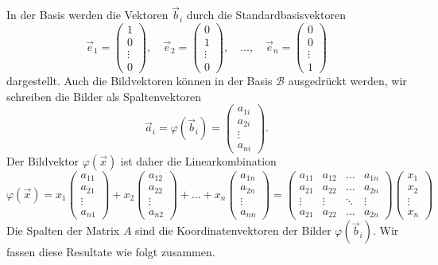 In der Basis werden die Vektoren $\vec{b}_i$ durch die Standardbasisvektoren
\[
\vec{e}_1 = \begin{pmatrix}1\\0\\\vdots\\0\end{pmatrix},\quad
\vec{e}_2 = \begin{pmatrix}0\\1\\\vdots\\0\end{pmatrix},
\quad\dots,\quad
\vec{e}_n = \begin{pmatrix}0\\0\\\vdots\\1\end{pmatrix}
\]
dargestellt.
Auch die Bildvektoren können in der Basis $\mathcal{B}$ ausgedrückt werden,
wir schreiben die Bilder als Spaltenvektoren
\[
\vec{a}_i
=
\varphi(\vec{b}_i)
=
\begin{pmatrix}
a_{1i}\\a_{2i}\\\vdots\\a_{ni}
\end{pmatrix}.
\]
Der Bildvektor $\varphi(\vec{x})$ ist daher die Linearkombination
\[
\varphi(\vec{x})
=
x_1
\begin{pmatrix}
a_{11}\\a_{21}\\\vdots\\a_{n1}
\end{pmatrix}
+
x_2
\begin{pmatrix}
a_{12}\\a_{22}\\\vdots\\a_{n2}
\end{pmatrix}
+
\dots
+
x_n
\begin{pmatrix}
a_{1n}\\a_{2n}\\\vdots\\a_{nn}
\end{pmatrix}
=
\begin{pmatrix}
a_{11}&a_{12}&\dots &a_{1n}\\
a_{21}&a_{22}&\dots &a_{2n}\\
\vdots&\vdots&\ddots&\vdots\\
a_{21}&a_{22}&\dots &a_{2n}
\end{pmatrix}
\begin{pmatrix}
x_1\\x_2\\\vdots\\x_n
\end{pmatrix}
\]
Die Spalten der Matrix $A$ sind die Koordinatenvektoren der Bilder
$\varphi(\vec{b}_i)$.
Wir fassen diese Resultate wie folgt zusammen.

